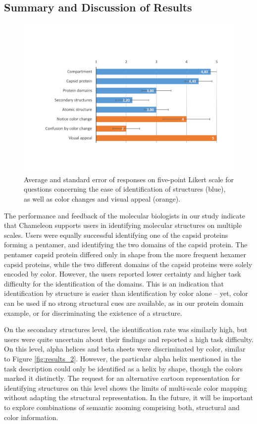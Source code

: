 \documentclass{egpubl}
\begin{document}
\subsection{Summary and Discussion of Results}
 \begin{figure}
 	\centering
 	\includegraphics[width=1.0\linewidth]{Figures/questionnaires.pdf}
 	\caption{Average and standard error of responses on five-point Likert scale for questions concerning the ease of identification of structures (blue), as well as color changes and visual appeal (orange).}
 	\label{fig:questionnaire}
 \end{figure}
The performance and feedback of the molecular biologists in our study indicate that Chameleon supports users in identifying molecular structures on multiple scales. 
Users were equally successful identifying one of the capsid proteins forming a pentamer, and identifying the two domains of the capsid protein. 
The pentamer capsid protein differed only in shape from the more frequent hexamer capsid proteins, while the two different domains of the capsid proteins were solely encoded by color. 
However, the users reported lower certainty and higher task difficulty for the identification of the domains.
This is an indication that identification by structure is easier than identification by color alone -- yet, color can be used if no strong structural cues are available, as in our protein domain example, or for discriminating the existence of a structure.

On the secondary structures level, the identification rate was similarly high, but users were quite uncertain about their findings and reported a high task difficulty. 
On this level, alpha helices and beta sheets were discriminated by color, similar to Figure \ref{fig:results_2}. 
However, the particular alpha helix mentioned in the task description could only be identified as a helix by shape, though the colors marked it distinctly. 
The request for an alternative cartoon representation for identifying structures on this level shows the limits of multi-scale color mapping without adapting the structural representation. 
In the future, it will be important to explore combinations of semantic zooming comprising both, structural and color information. 
\end{document}
